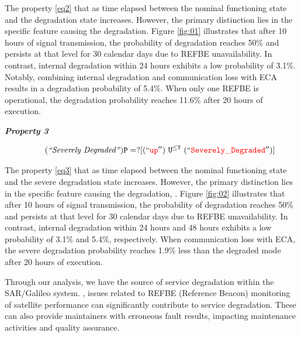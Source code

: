         \normalsize

The property \ref{eq2}  that as time elapsed between the nominal functioning state and the degradation state increases. However, the primary distinction lies in the specific feature causing the degradation. Figure \ref{fig:01} illustrates that after 10 hours of signal transmission, the probability of degradation reaches 50\% and persists at that level for 30 calendar days due to REFBE unavailability. In contrast, internal degradation within 24 hours exhibits a low probability of 3.1\%. Notably, combining internal degradation and communication loss with ECA results in a degradation probability of 5.4\%. When only one REFBE is operational, the degradation probability reaches 11.6\%  after 20 hours of execution.


	    \begin{resp}{\textbf{\textit{Property 3}}}

        \begin{equation}
        \label{eq3}\tag{\emph{\quot{Severely Degraded}}}
         \mathtt{ P=? [ (\quot{\textcolor{red}{up} }) \  U^{\leq T} \ (\quot{\textcolor{red}{Severely\_Degraded} })  ]} 
        \end{equation}
        
        \end{resp}
        
        \normalsize


        
The property \ref{eq3}  that as time elapsed between the nominal functioning state and the severe degradation state increases. However, the primary distinction lies in the specific feature causing the degradation,  . Figure \ref{fig:02} illustrates that after 10 hours of signal transmission, the probability of degradation reaches 50\% and persists at that level for 30 calendar days due to REFBE unavailability. In contrast, internal degradation within 24 hours and 48 hours exhibits a low probability of 3.1\% and 5.4\%, respectively.  When communication loss with ECA, the severe degradation probability reaches 1.9\% less than the degraded mode after 20 hours of execution.

Through our analysis, we have  the source of service degradation within the SAR/Galileo system. , issues related to REFBE (Reference Beacon) monitoring of satellite performance can significantly contribute to service degradation. These  can also provide maintainers with erroneous fault results, impacting maintenance activities and quality assurance.



